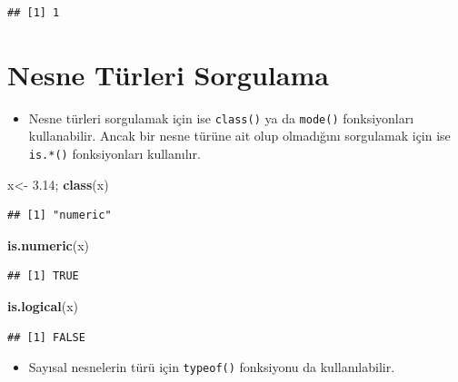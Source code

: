 \documentclass[
  oneside]{book}
\newenvironment{Shaded}{\begin{snugshade}}{\end{snugshade}}
\newcommand{\FloatTok}[1]{\textcolor[rgb]{0.00,0.00,0.81}{#1}}
\newcommand{\FunctionTok}[1]{\textcolor[rgb]{0.13,0.29,0.53}{\textbf{#1}}}
\newcommand{\NormalTok}[1]{#1}
\newcommand{\OtherTok}[1]{\textcolor[rgb]{0.56,0.35,0.01}{#1}}
\providecommand{\tightlist}{%
  \setlength{\itemsep}{0pt}\setlength{\parskip}{0pt}}
\begin{document}
\begin{verbatim}
## [1] 1
\end{verbatim}

\hypertarget{nesne-tuxfcrleri-sorgulama}{%
\section{Nesne Türleri Sorgulama}\label{nesne-tuxfcrleri-sorgulama}}

\begin{itemize}
\tightlist
\item
  Nesne türleri sorgulamak için ise \texttt{class()} ya da \texttt{mode()} fonksiyonları kullanabilir. Ancak bir nesne türüne ait olup olmadığını sorgulamak için ise \texttt{is.*()} fonksiyonları kullanılır.
\end{itemize}

\begin{Shaded}
\begin{Highlighting}[]
\NormalTok{x}\OtherTok{\textless{}{-}} \FloatTok{3.14}\NormalTok{; }\FunctionTok{class}\NormalTok{(x)}
\end{Highlighting}
\end{Shaded}

\begin{verbatim}
## [1] "numeric"
\end{verbatim}

\begin{Shaded}
\begin{Highlighting}[]
\FunctionTok{is.numeric}\NormalTok{(x)}
\end{Highlighting}
\end{Shaded}

\begin{verbatim}
## [1] TRUE
\end{verbatim}

\begin{Shaded}
\begin{Highlighting}[]
\FunctionTok{is.logical}\NormalTok{(x)}
\end{Highlighting}
\end{Shaded}

\begin{verbatim}
## [1] FALSE
\end{verbatim}

\begin{itemize}
\tightlist
\item
  Sayısal nesnelerin türü için \texttt{typeof()} fonksiyonu da kullanılabilir.
\end{itemize}
\end{document}
